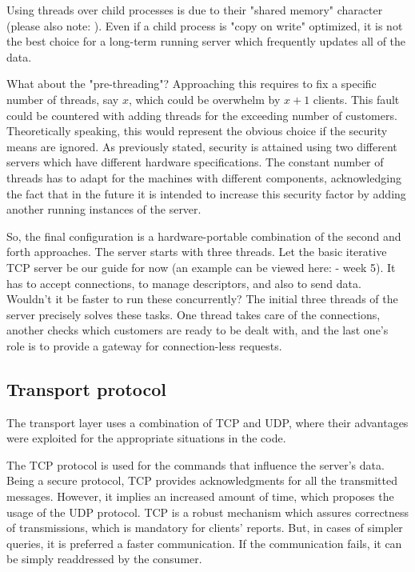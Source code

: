 \documentclass[runningheads]{llncs}
\begin{document}
Using threads over child processes is due to their "shared memory" character (please also note: \cite{fork-vs-thread}). Even if a child process is "copy on write" optimized, it is not the best choice for a long-term running server which frequently updates all of the data. 

What about the "pre-threading"? Approaching this requires to fix a specific number of threads, say $x$, which could be overwhelm by $x + 1$ clients. This fault could be countered with adding threads for the exceeding number of customers. Theoretically speaking, this would represent the obvious choice if the security means are ignored. As previously stated, security is attained using two different servers which have different hardware specifications. The constant number of threads has to adapt for the machines with different components, acknowledging the fact that in the future it is intended to increase this security factor by adding another running instances of the server.

So, the final configuration is a hardware-portable combination of the second and forth approaches. The server starts with three threads. Let the basic iterative TCP server be our guide for now (an example can be viewed here: \cite{course} - week 5). It has to accept connections, to manage descriptors, and also to send data. Wouldn't it be faster to run these concurrently? The initial three threads of the server precisely solves these tasks. One thread takes care of the connections, another checks which customers are ready to be dealt with, and the last one's role is to provide a gateway for connection-less requests.

\subsection{Transport protocol}

The transport layer uses a combination of TCP and UDP, where their advantages were exploited for the appropriate situations in the code.

The TCP protocol is used for the commands that influence the server's data. Being a secure protocol, TCP provides acknowledgments for all the transmitted messages. However, it implies an increased amount of time, which proposes the usage of the UDP protocol. TCP is a robust mechanism which assures correctness of transmissions, which is mandatory for clients' reports. But, in cases of simpler queries, it is preferred a faster communication. If the communication fails, it can be simply readdressed by the consumer.
\end{document}
